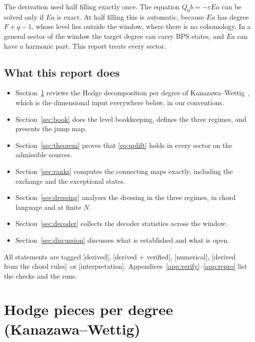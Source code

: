 \documentclass[11pt]{article}
\newcommand{\tagbox}[2]{\textsf{\small\color{#1}[#2]}}
\newcommand{\DER}{\tagbox{cder}{derived}}
\newcommand{\VER}{\tagbox{cder}{derived + verified}}
\newcommand{\NUM}{\tagbox{cnum}{numerical}}
\newcommand{\CHORD}{\tagbox{cder}{derived from the chord rules}}
\newcommand{\INTERP}{\tagbox{cconj}{interpretation}}
\theoremstyle{plain}
\theoremstyle{remark}
\numberwithin{equation}{section}
\begin{document}
The derivation used half filling exactly once. The equation $Q_0b=-\varepsilon Ea$ can be solved only if $Ea$ is exact.
At half filling this is automatic, because $Ea$ has degree $F+q-1$, whose level lies outside the window, where there is
no cohomology. In a general sector of the window the target degree can carry BPS states, and $Ea$ can have a harmonic
part. This report treats every sector.

\subsection{What this report does}
\begin{itemize}\itemsep1pt
\item Section~\ref{sec:kw} reviews the Hodge decomposition per degree of Kanazawa--Wettig~\cite{KW}, which is the
dimensional input everywhere below, in our conventions.
\item Section~\ref{sec:book} does the level bookkeeping, defines the three regimes, and presents the jump map.
\item Section~\ref{sec:theorem} proves that \eqref{eq:uplift} holds in every sector on the admissible sources.
\item Section~\ref{sec:ranks} computes the connecting maps exactly, including the exchange and the exceptional states.
\item Section~\ref{sec:dressing} analyses the dressing in the three regimes, in chord language and at finite $N$.
\item Section~\ref{sec:decoder} collects the decoder statistics across the window.
\item Section~\ref{sec:discussion} discusses what is established and what is open.
\end{itemize}
All statements are tagged \DER, \VER, \NUM, \CHORD\ or \INTERP. Appendices~\ref{app:verify}--\ref{app:repro} list the
checks and the runs.

\section{Hodge pieces per degree (Kanazawa--Wettig)}\label{sec:kw}
\end{document}
